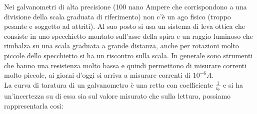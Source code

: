 \documentclass[a4paper, oneside]{article}
\begin{document}
Nei galvanometri di alta precisione (100 nano Ampere che corrispondono a una divisione della scala graduata di riferimento) non c'è un ago fisico (troppo pesante e soggetto ad attriti). Al suo posto si usa un sistema di leva ottica che consiste in uno specchietto montato sull'asse della spira e un raggio luminoso che rimbalza su una scala graduata a grande distanza, anche per rotazioni molto piccole dello specchietto si ha un riscontro sulla scala. 
In generale sono strumenti che hanno una resistenza molto bassa e quindi permettono di misurare correnti molto piccole, ai giorni d'oggi si arriva a misurare correnti di $10^{-6} A$.\\
La curva di taratura di un galvanometro è una retta con coefficiente $\frac{1}{k_r}$ e si ha un'incertezza su di essa sia sul valore misurato che sulla lettura, possiamo rappresentarla così:
\begin{center}
\end{center}
\end{document}
